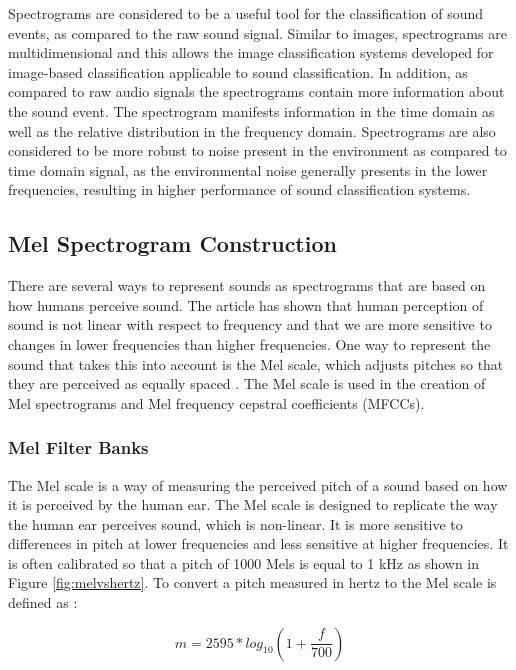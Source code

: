 Spectrograms are considered to be a useful tool for the classification of sound events, as compared to the raw sound signal. Similar to images, spectrograms are multidimensional and this allows the image classification systems developed for image-based classification applicable to sound classification. In addition, as compared to raw audio signals the spectrograms contain more information about the sound event. The spectrogram manifests information in the time domain as well as the relative distribution in the frequency domain. Spectrograms are also considered to be more robust to noise present in the environment as compared to time domain signal, as the environmental noise generally presents in the lower frequencies, resulting in higher performance of sound classification systems. 

\subsection{Mel Spectrogram Construction}

There are several ways to represent sounds as spectrograms that are based on how humans perceive sound. The article \cite{allen1981cochlear} has shown that human perception of sound is not linear with respect to frequency and that we are more sensitive to changes in lower frequencies than higher frequencies. One way to represent the sound that takes this into account is the Mel scale, which adjusts pitches so that they are perceived as equally spaced \cite{stevens1937scale}. The Mel scale  is used in the creation of Mel spectrograms and Mel frequency cepstral coefficients (MFCCs).

\subsubsection{Mel Filter Banks}


The Mel scale is a way of measuring the perceived pitch of a sound based on how it is perceived by the human ear. The Mel scale is designed to replicate the way the human ear perceives sound, which is non-linear. It is more sensitive to differences in pitch at lower frequencies and less sensitive at higher frequencies. It is often calibrated so that a pitch of 1000 Mels is equal to 1 kHz as shown in Figure \ref{fig:melvshertz}. To convert a pitch measured in hertz to the Mel scale is defined as \cite{flanagan2013speech}: 

\begin{equation}
\label{eq:freq2mel}
    m = 2595 *log_{10} \left(1+ \frac{f}{700} \right)
\end{equation}


